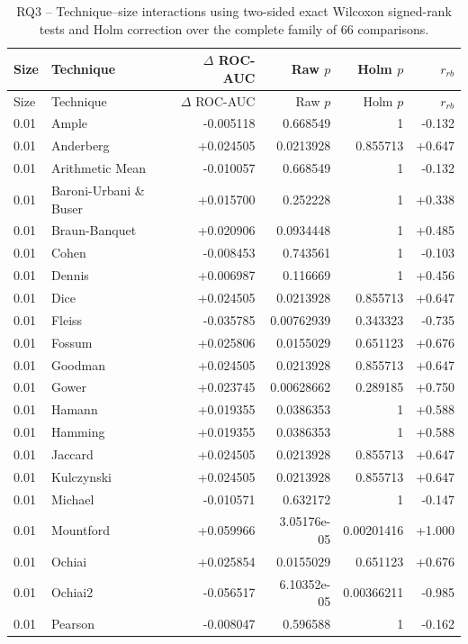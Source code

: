 \begin{longtable}{llrrrr}
\caption{RQ3 -- Technique--size interactions using two-sided exact Wilcoxon signed-rank tests and Holm correction over the complete family of 66 comparisons.}\\
\toprule
Size & Technique & $\Delta$ ROC-AUC & Raw $p$ & Holm $p$ & $r_{rb}$ \\
\midrule
\endfirsthead
\toprule
Size & Technique & $\Delta$ ROC-AUC & Raw $p$ & Holm $p$ & $r_{rb}$ \\
\midrule
\endhead
0.01 & Ample & -0.005118 & 0.668549 & 1 & -0.132 \\
0.01 & Anderberg & +0.024505 & 0.0213928 & 0.855713 & +0.647 \\
0.01 & Arithmetic Mean & -0.010057 & 0.668549 & 1 & -0.132 \\
0.01 & Baroni-Urbani \& Buser & +0.015700 & 0.252228 & 1 & +0.338 \\
0.01 & Braun-Banquet & +0.020906 & 0.0934448 & 1 & +0.485 \\
0.01 & Cohen & -0.008453 & 0.743561 & 1 & -0.103 \\
0.01 & Dennis & +0.006987 & 0.116669 & 1 & +0.456 \\
0.01 & Dice & +0.024505 & 0.0213928 & 0.855713 & +0.647 \\
0.01 & Fleiss & -0.035785 & 0.00762939 & 0.343323 & -0.735 \\
0.01 & Fossum & +0.025806 & 0.0155029 & 0.651123 & +0.676 \\
0.01 & Goodman & +0.024505 & 0.0213928 & 0.855713 & +0.647 \\
0.01 & Gower & +0.023745 & 0.00628662 & 0.289185 & +0.750 \\
0.01 & Hamann & +0.019355 & 0.0386353 & 1 & +0.588 \\
0.01 & Hamming & +0.019355 & 0.0386353 & 1 & +0.588 \\
0.01 & Jaccard & +0.024505 & 0.0213928 & 0.855713 & +0.647 \\
0.01 & Kulczynski & +0.024505 & 0.0213928 & 0.855713 & +0.647 \\
0.01 & Michael & -0.010571 & 0.632172 & 1 & -0.147 \\
0.01 & Mountford & +0.059966 & 3.05176e-05 & 0.00201416 & +1.000 \\
0.01 & Ochiai & +0.025854 & 0.0155029 & 0.651123 & +0.676 \\
0.01 & Ochiai2 & -0.056517 & 6.10352e-05 & 0.00366211 & -0.985 \\
0.01 & Pearson & -0.008047 & 0.596588 & 1 & -0.162 \\

\end{longtable}
